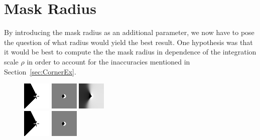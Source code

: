 \section{Mask Radius}\label{sec:MaskEx}
By introducing the mask radius as an additional parameter, we now have to pose the question of what
radius would yield the best result. One hypothesis\cite{conversation} was that it would be best to compute the the
mask radius in dependence of the integration scale $\rho$ in order to account for the inaccuracies
mentioned in Section~\ref{sec:CornerEx}. \\
\begin{figure}[h]
    \centering
    \includegraphics[width=0.2\linewidth]{../Images/disctest/flatcorner1.png}\hspace{0.2cm}
    \includegraphics[width=0.2\linewidth]{../Images/disctest/flatcorner1mask.png}\hspace{0.2cm}
    \includegraphics[width=0.2\linewidth]{../Images/disctest/flatcorner1inpaint.png}\\
    \vspace*{0.2cm}
    \includegraphics[width=0.2\linewidth]{../Images/disctest/flatcorner2.png}\hspace{0.2cm}
    \includegraphics[width=0.2\linewidth]{../Images/disctest/flatcorner2mask.png}\hspace{0.2cm}

\end{figure}
